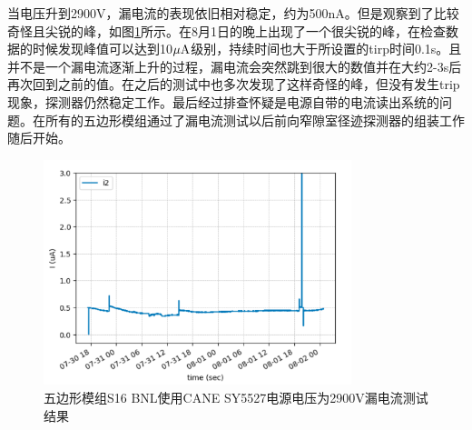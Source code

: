 当电压升到2900V，漏电流的表现依旧相对稳定，约为500nA。但是观察到了比较奇怪且尖锐的峰，如图\ref{fig:LeakCurrent_SY5527_2900}所示。在8月1日的晚上出现了一个很尖锐的峰，在检查数据的时候发现峰值可以达到10${\rm \mu A}$级别，持续时间也大于所设置的tirp时间0.1s。且并不是一个漏电流逐渐上升的过程，漏电流会突然跳到很大的数值并在大约2-3s后再次回到之前的值。在之后的测试中也多次发现了这样奇怪的峰，但没有发生trip现象，探测器仍然稳定工作。最后经过排查怀疑是电源自带的电流读出系统的问题。在所有的五边形模组通过了漏电流测试以后前向窄隙室径迹探测器的组装工作随后开始。
\begin{figure}[htb]
    \begin{center}
    \includegraphics[width=0.8\textwidth,clip]{figures/Chapter3/LeakCurrent_SY5527_2900.png}
    \end{center}
    \caption[五边形模组S16 BNL使用CANE SY5527电源电压为2900V漏电流测试结果]{五边形模组S16 BNL使用CANE SY5527电源电压为2900V漏电流测试结果}
    \label{fig:LeakCurrent_SY5527_2900}
\end{figure}